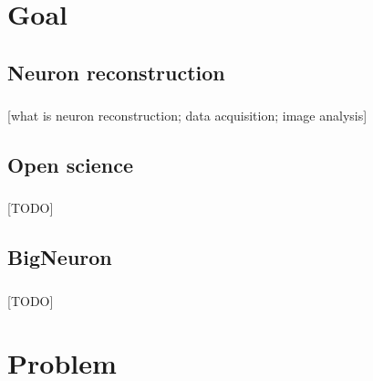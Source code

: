 \documentclass{beamer}
\begin{document}

\frame{\titlepage}

\section{Goal}

\subsection{Neuron reconstruction}
\begin{frame}\frametitle{\subsecname}
	[what is neuron reconstruction; data acquisition; image analysis]
\end{frame}

\subsection{Open science}
\begin{frame}\frametitle{\subsecname}
	[TODO]
\end{frame}

\subsection{BigNeuron}
\begin{frame}\frametitle{\subsecname}
	[TODO]
\end{frame}

\section{Problem}
\begin{frame}\frametitle{\secname}
\end{frame}
\end{document}
